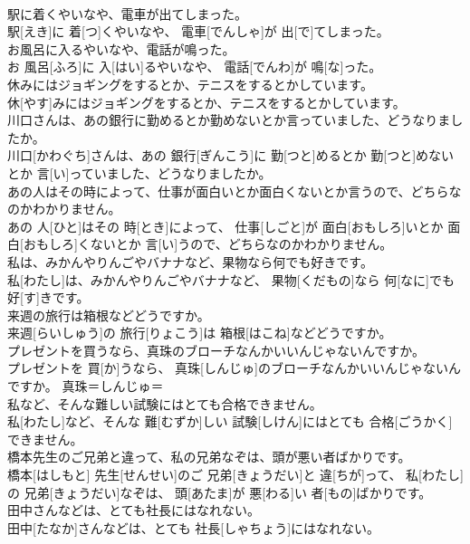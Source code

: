 \documentclass[8pt]{extreport}
\begin{document}
\begin{CJK}{UTF8}{min}
\\	駅に着くやいなや、電車が出てしまった。	
\\	駅[えき]に 着[つ]くやいなや、 電車[でんしゃ]が 出[で]てしまった。	
\\	お風呂に入るやいなや、電話が鳴った。	
\\	お 風呂[ふろ]に 入[はい]るやいなや、 電話[でんわ]が 鳴[な]った。	
\\	休みにはジョギングをするとか、テニスをするとかしています。	
\\	休[やす]みにはジョギングをするとか、テニスをするとかしています。	
\\	川口さんは、あの銀行に勤めるとか勤めないとか言っていました、どうなりましたか。	
\\	川口[かわぐち]さんは、あの 銀行[ぎんこう]に 勤[つと]めるとか 勤[つと]めないとか 言[い]っていました、どうなりましたか。	
\\	あの人はその時によって、仕事が面白いとか面白くないとか言うので、どちらなのかわかりません。	
\\	あの 人[ひと]はその 時[とき]によって、 仕事[しごと]が 面白[おもしろ]いとか 面白[おもしろ]くないとか 言[い]うので、どちらなのかわかりません。	
\\	私は、みかんやりんごやバナナなど、果物なら何でも好きです。	
\\	私[わたし]は、みかんやりんごやバナナなど、 果物[くだもの]なら 何[なに]でも 好[す]きです。	
\\	来週の旅行は箱根などどうですか。	
\\	来週[らいしゅう]の 旅行[りょこう]は 箱根[はこね]などどうですか。	
\\	プレゼントを買うなら、真珠のブローチなんかいいんじゃないんですか。	
\\	プレゼントを 買[か]うなら、 真珠[しんじゅ]のブローチなんかいいんじゃないんですか。	真珠＝しんじゅ＝ 
\\	私など、そんな難しい試験にはとても合格できません。	
\\	私[わたし]など、そんな 難[むずか]しい 試験[しけん]にはとても 合格[ごうかく]できません。	
\\	橋本先生のご兄弟と違って、私の兄弟なぞは、頭が悪い者ばかりです。	
\\	橋本[はしもと] 先生[せんせい]のご 兄弟[きょうだい]と 違[ちが]って、 私[わたし]の 兄弟[きょうだい]なぞは、 頭[あたま]が 悪[わる]い 者[もの]ばかりです。	
\\	田中さんなどは、とても社長にはなれない。	
\\	田中[たなか]さんなどは、とても 社長[しゃちょう]にはなれない。	

\end{CJK}
\end{document}
